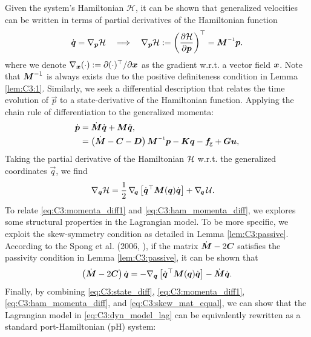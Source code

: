 Given the system's Hamiltonian $\mathcal{H}$, it can be shown that generalized velocities can be written in terms of partial derivatives of the Hamiltonian function
%
\begin{equation}
\dot{\vec{q}} = \nabla_{\vec{p}} \Hm \quad \Longrightarrow  \quad \nabla_{\vec{p}} \Hm := \left(\frac{\p \Hm}{\p \pB} \right)^\top= \mat{M}\inv \vec{p}.
\label{eq:C3:state_diff}
\end{equation}
%
where we denote $\nabla_{{\boldsymbol{x}}}(\cdot) := \partial (\cdot)^\top/\partial {\boldsymbol{x}}$ as the gradient w.r.t. a vector field ${\boldsymbol{x}}$. Note that $\boldsymbol{M}^{-1}$ is always exists due to the positive definiteness condition in Lemma \ref{lem:C3:1}. Similarly, we seek a differential description that relates the time evolution of $\vec{p}$ to a state-derivative of the Hamiltonian function. Applying the chain rule of differentiation to the generalized momenta:
%
\begin{align}
\dot{\vec{p}} & = \dot{\mat{M}}\dot{\vec{q}} + \mat{M}\ddot{\vec{q}},\notag \\
& = \left(\dot{\mat{M}} - \mat{C} - \mat{D} \right) \mat{M}\inv \vec{p} - \vec{Kq} - \vec{f}\!\grav + \vec{Gu}
\label{eq:C3:momenta_diff1},
\end{align}
%
Taking the partial derivative of the Hamiltonian $\mathcal{H}$ w.r.t. the generalized coordinates $\vec{q}$, we find
\begin{align}
\nabla_{\boldsymbol{q}} \mathcal{H} & = \frac{1}{2} \,\nabla_{\!{\boldsymbol{q}}} \left[ \dot{\boldsymbol{q}}^\top \boldsymbol{M}(\boldsymbol{q}) \dot{\boldsymbol{q}} \right] + \nabla_{\!\boldsymbol{q}}\, \mathcal{U}.
\label{eq:C3:ham_momenta_diff}
\end{align}
%
To relate \eqref{eq:C3:momenta_diff1} and \eqref{eq:C3:ham_momenta_diff}, we explores some structural properties in the Lagrangian model. To be more specific, we exploit the skew-symmetry condition as detailed in Lemma \ref{lem:C3:passive}. According to the Spong et al. (2006, \cite{Spong2006}), if the matrix $\dot{\boldsymbol{M}} - 2\boldsymbol{C}$ satisfies the passivity condition in Lemma \ref{lem:C3:passive}, it can be shown that
%
\begin{equation}
\left( \dot{\boldsymbol{M}} - 2\boldsymbol{C} \right) \dot{\boldsymbol{q}} =  -\nabla_{\boldsymbol{q}} \left[ \dot{\boldsymbol{q}}^\top \boldsymbol{M}(\boldsymbol{q}) \dot{\boldsymbol{q}} \right] - \dot{\boldsymbol{M}}\dot{\boldsymbol{q}}. \label{eq:C3:skew_mat_equal}
\end{equation}
%
Finally, by combining \eqref{eq:C3:state_diff}, \eqref{eq:C3:momenta_diff1}, \eqref{eq:C3:ham_momenta_diff}, and \eqref{eq:C3:skew_mat_equal}, we can show that the Lagrangian model in \eqref{eq:C3:dyn_model_lag} can be equivalently rewritten as a standard port-Hamiltonian (pH) system:
